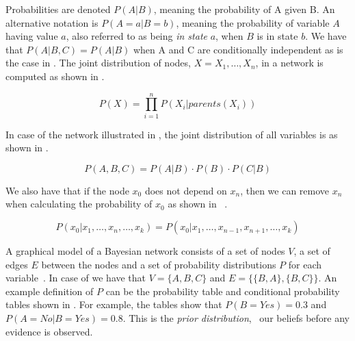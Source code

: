 Probabilities are denoted $P(A|B)$, meaning the probability of A given B. An alternative notation is $P(A=a|B=b)$, meaning the probability of variable $A$ having value $a$, also referred to as being \emph{in state} $a$, when $B$ is in state $b$. We have that $P(A|B,C) = P(A|B)$ when A and C are conditionally independent as is the case in . The joint distribution of nodes, $X = X_1,\ldots,X_n$, in a network is computed as shown in  \cite{stephenson2000introduction}.

\begin{equation}
\label{eq:analysis:bayesian-network:prod}
P(X) = \displaystyle \prod_{i=1}^{n} P(X_i|parents(X_i))
\end{equation}

In case of the network illustrated in , the joint distribution of all variables is as shown in  \cite{stephenson2000introduction}.

\begin{equation}
\label{eq:analysis:bayesian-network:prod-example}
P(A, B, C) = P(A|B) \cdot P(B) \cdot P(C|B)
\end{equation}

We also have that if the node $x_0$ does not depend on $x_n$, then we can remove $x_n$ when calculating the probability of $x_0$ as shown in ~\cite{stephenson2000introduction}.

\begin{equation}
\label{eq:analysis:bayesian-network:not-child}
P(x_0|x_1,\ldots,x_n,\ldots,x_k) = P(x_0|x_1,\ldots,x_{n-1},x_{n+1},\ldots,x_k)
\end{equation}

A graphical model of a Bayesian network consists of a set of nodes $V$, a set of edges $E$ between the nodes and a set of probability distributions $P$ for each variable~\cite{stephenson2000introduction}. In case of  we have that $V = \{A, B, C\}$ and $E = \{\{B, A\}, \{B,C\}\}$. An example definition of $P$ can be the probability table and conditional probability tables shown in . For example, the tables show that $P(B=Yes) = 0.3$ and $P(A=No|B=Yes) = 0.8$. This is the \emph{prior distribution}, \ie~our beliefs before any evidence is observed.

